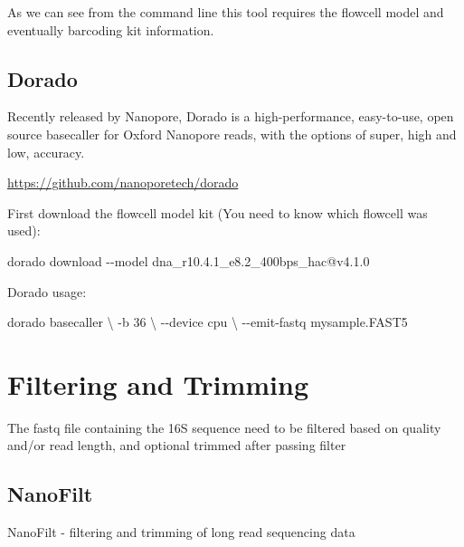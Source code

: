 \documentclass[
]{book}
\newenvironment{Shaded}{\begin{snugshade}}{\end{snugshade}}
\newcommand{\AttributeTok}[1]{\textcolor[rgb]{0.13,0.29,0.53}{#1}}
\newcommand{\DataTypeTok}[1]{\textcolor[rgb]{0.13,0.29,0.53}{#1}}
\newcommand{\ExtensionTok}[1]{#1}
\newcommand{\NormalTok}[1]{#1}
\begin{document}
As we can see from the command line this tool requires the flowcell model and eventually barcoding kit information.

\subsection{Dorado}\label{dorado}

Recently released by Nanopore, Dorado is a high-performance, easy-to-use, open source basecaller for Oxford Nanopore reads, with the options of super, high and low, accuracy.

\url{https://github.com/nanoporetech/dorado}

First download the flowcell model kit (You need to know which flowcell was used):

\begin{Shaded}
\begin{Highlighting}[]
\ExtensionTok{dorado}\NormalTok{ download }\AttributeTok{{-}{-}model}\NormalTok{ dna\_r10.4.1\_e8.2\_400bps\_hac@v4.1.0}
\end{Highlighting}
\end{Shaded}

Dorado usage:

\begin{Shaded}
\begin{Highlighting}[]
\ExtensionTok{dorado}\NormalTok{ basecaller }\DataTypeTok{\textbackslash{}}
  \AttributeTok{{-}b}\NormalTok{ 36 }\DataTypeTok{\textbackslash{}}
  \AttributeTok{{-}{-}device}\NormalTok{ cpu }\DataTypeTok{\textbackslash{}}
  \AttributeTok{{-}{-}emit{-}fastq}
  \ExtensionTok{mysample.FAST5}
\end{Highlighting}
\end{Shaded}

\section{Filtering and Trimming}\label{filtering-and-trimming}

The fastq file containing the 16S sequence need to be filtered based on quality and/or read length, and optional trimmed after passing filter

\subsection{NanoFilt}\label{nanofilt}

NanoFilt - filtering and trimming of long read sequencing data
\end{document}

